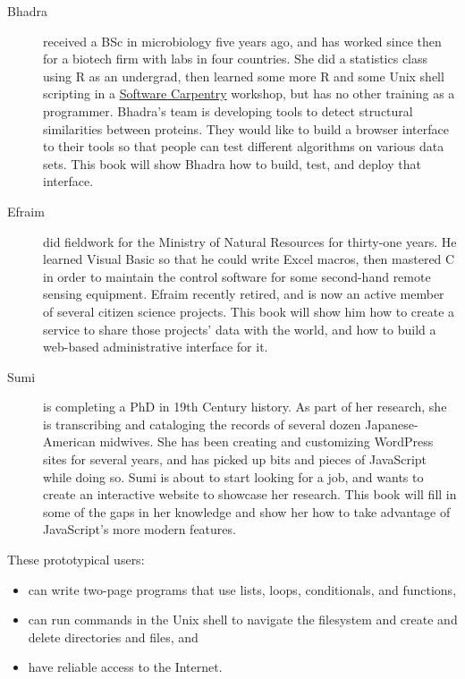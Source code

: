 \begin{description}

\item[Bhadra]
received a BSc in microbiology five years ago,
and has worked since then for a biotech firm with labs in four countries.
She did a statistics class using R as an undergrad,
then learned some more R and some Unix shell scripting
in a \href{http://software-carpentry.org/}{Software Carpentry} workshop,
but has no other training as a programmer.
Bhadra's team is developing tools
to detect structural similarities between proteins.
They would like to build a browser interface to their tools
so that people can test different algorithms on various data sets.
This book will show Bhadra how to build, test, and deploy that interface.

\item[Efraim]
did fieldwork for the Ministry of Natural Resources for thirty-one years.
He learned Visual Basic so that he could write Excel macros,
then mastered C in order to maintain the control software
for some second-hand remote sensing equipment.
Efraim recently retired,
and is now an active member of several citizen science projects.
This book will show him how to create a service
to share those projects' data with the world,
and how to build a web-based administrative interface for it.

\item[Sumi]
is completing a PhD in 19th Century history.
As part of her research,
she is transcribing and cataloging the records of several dozen Japanese-American midwives.
She has been creating and customizing WordPress sites for several years,
and has picked up bits and pieces of JavaScript while doing so.
Sumi is about to start looking for a job,
and wants to create an interactive website to showcase her research.
This book will fill in some of the gaps in her knowledge
and show her how to take advantage of JavaScript's more modern features.

\end{description}

These prototypical users:

\begin{itemize}
\item
  can write two-page programs that use lists, loops, conditionals, and functions,
\item
  can run commands in the Unix shell to navigate the filesystem and create and delete directories and files, and
\item
  have reliable access to the Internet.
\end{itemize}

